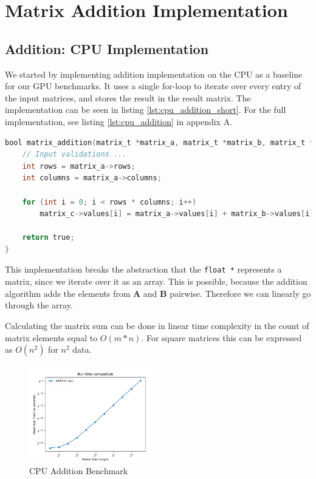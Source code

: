 \section{Matrix Addition Implementation}

\subsection{Addition: CPU Implementation}

We started by implementing addition implementation on the CPU as a baseline for our GPU benchmarks. It uses a single for-loop to iterate over every entry of the input matrices, and stores the result in the result matrix. The implementation can be seen in listing \ref{lst:cpu_addition_short}. For the full implementation, see listing \ref{lst:cpu_addition} in appendix A. 


\begin{lstlisting}[language=C, caption={CPU addition algorithm}, label={lst:cpu_addition_short}]
bool matrix_addition(matrix_t *matrix_a, matrix_t *matrix_b, matrix_t *matrix_c) {
    // Input validations ...
    int rows = matrix_a->rows;
    int columns = matrix_a->columns;

    for (int i = 0; i < rows * columns; i++)
        matrix_c->values[i] = matrix_a->values[i] + matrix_b->values[i];

    return true;
}
\end{lstlisting}

This implementation breaks the abstraction that the \texttt{float *} represents a matrix, since we iterate over it as an array. This is possible, because the addition algorithm adds the elements from $\mathbf{A}$ and $\mathbf{B}$ pairwise. Therefore we can linearly go through the array.

Calculating the matrix sum can be done in linear time complexity in the count of matrix elements equal to $O(m * n)$. For square matrices this can be expressed as $O(n^2)$ for $n^2$ data. 

\begin{figure}
    \centering
    \includegraphics[width=0.5\textwidth]{SavedBenchmarksAndDiagrams/Machine 2/Addition CPU.png}
    \caption{CPU Addition Benchmark}
    \label{fig:addition_cpu_bench}
\end{figure}


